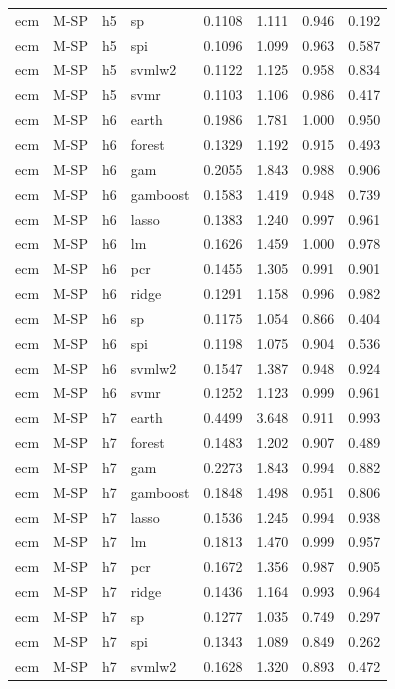 \begin{ThreePartTable}
\begin{longtable}[t]{llclcccc}
ecm & M-SP & h5 & sp & 0.1108 & 1.111 & 0.946 & 0.192\\
ecm & M-SP & h5 & spi & 0.1096 & 1.099 & 0.963 & 0.587\\
ecm & M-SP & h5 & svmlw2 & 0.1122 & 1.125 & 0.958 & 0.834\\
ecm & M-SP & h5 & svmr & 0.1103 & 1.106 & 0.986 & 0.417\\
\addlinespace
ecm & M-SP & h6 & earth & 0.1986 & 1.781 & 1.000 & 0.950\\
ecm & M-SP & h6 & forest & 0.1329 & 1.192 & 0.915 & 0.493\\
ecm & M-SP & h6 & gam & 0.2055 & 1.843 & 0.988 & 0.906\\
ecm & M-SP & h6 & gamboost & 0.1583 & 1.419 & 0.948 & 0.739\\
ecm & M-SP & h6 & lasso & 0.1383 & 1.240 & 0.997 & 0.961\\
ecm & M-SP & h6 & lm & 0.1626 & 1.459 & 1.000 & 0.978\\
ecm & M-SP & h6 & pcr & 0.1455 & 1.305 & 0.991 & 0.901\\
ecm & M-SP & h6 & ridge & 0.1291 & 1.158 & 0.996 & 0.982\\
ecm & M-SP & h6 & sp & 0.1175 & 1.054 & 0.866 & 0.404\\
ecm & M-SP & h6 & spi & 0.1198 & 1.075 & 0.904 & 0.536\\
ecm & M-SP & h6 & svmlw2 & 0.1547 & 1.387 & 0.948 & 0.924\\
ecm & M-SP & h6 & svmr & 0.1252 & 1.123 & 0.999 & 0.961\\
\addlinespace
ecm & M-SP & h7 & earth & 0.4499 & 3.648 & 0.911 & 0.993\\
ecm & M-SP & h7 & forest & 0.1483 & 1.202 & 0.907 & 0.489\\
ecm & M-SP & h7 & gam & 0.2273 & 1.843 & 0.994 & 0.882\\
ecm & M-SP & h7 & gamboost & 0.1848 & 1.498 & 0.951 & 0.806\\
ecm & M-SP & h7 & lasso & 0.1536 & 1.245 & 0.994 & 0.938\\
ecm & M-SP & h7 & lm & 0.1813 & 1.470 & 0.999 & 0.957\\
ecm & M-SP & h7 & pcr & 0.1672 & 1.356 & 0.987 & 0.905\\
ecm & M-SP & h7 & ridge & 0.1436 & 1.164 & 0.993 & 0.964\\
ecm & M-SP & h7 & sp & 0.1277 & 1.035 & 0.749 & 0.297\\
ecm & M-SP & h7 & spi & 0.1343 & 1.089 & 0.849 & 0.262\\
ecm & M-SP & h7 & svmlw2 & 0.1628 & 1.320 & 0.893 & 0.472\\

\end{longtable}
\end{ThreePartTable}
